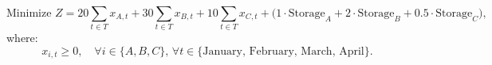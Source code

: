 \documentclass[12pt]{article}
\begin{document}
\[
\text{Minimize } Z = 20 \sum_{t \in T} x_{A,t} + 30 \sum_{t \in T} x_{B,t} + 10 \sum_{t \in T} x_{C,t} + \big(1 \cdot \text{Storage}_{A} + 2 \cdot \text{Storage}_{B} + 0.5 \cdot \text{Storage}_{C}\big),
\]
where:
\[
x_{i,t} \geq 0, \quad \forall i \in \{A, B, C\}, \, \forall t \in \{\text{January, February, March, April}\}.
\]
\end{document}
